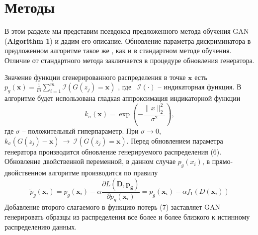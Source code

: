 \documentclass[preprint,12pt]{elsarticle}
\begin{document}
\section{Методы}
\label{S:3}
В этом разделе мы представим псевдокод предложенного метода обучения GAN ({\bf Algorithm 1}) и дадим его описание.
Обновление параметра дискриминатора в предложенном алгоритме такое же , как и в стандартном методе обучения. 
Отличие от стандартного метода заключается в процедуре обновления генератора. 
\par Значение функции сгенерированного распределения в точке $\mathbf{x}$ есть $p_g (\mathbf{x}) = \frac{1}{m} \sum \limits _{i =1} ^m \mathcal{I} ( G (z_j) = \mathbf{x})$ , где  \ $\mathcal{I}(\cdot)$ -- индикаторная функция.
В алгоритме будет использована гладкая аппроксимация индикаторной функции 
\begin{equation}
    k_\sigma (\mathbf{x}) = \exp ( - \frac{\| x \|_2^2}{\sigma ^2} ) ,
\end{equation} 
где $\sigma $ -- положительный гиперпараметр. При $\sigma \to 0 $, $k_\sigma (G(z_j) - \mathbf{x}) \ \to \ \mathcal{I}(G(z_j) = \mathbf{x})$.
Перед обновлением параметра генератора производится обновление генерируемого распределения (6). Обновление двойственной переменной, в данном случае $p_g(x_i)$, в прямо-двойственном алгоритме производится по правилу
\begin{equation*}
\tilde{p}_g (\mathbf{x}_i) = p_g(\mathbf{x}_i) - \alpha \frac{\partial L ( \mathbf{D} , \mathbf{p_g})}{\partial p_g (\mathbf{x}_i)} = p_g(\mathbf{x}_i) - \alpha f_1 \left( D(\mathbf{x}_i) \right)
\end{equation*}
Добавление второго слагаемого в функцию потерь (7) заставляет GAN генерировать образцы из распределения все более и более близкого к  
истинному распределению данных.  

\end{document}
